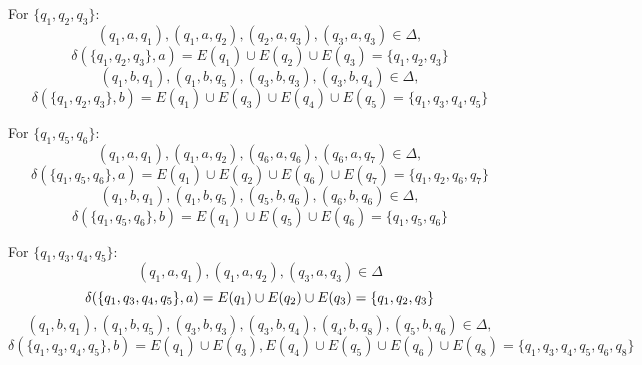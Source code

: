 \documentclass[12pt]{article}
\begin{document}
For $\{q_1, q_2, q_3\}$:
\begin{equation*}
	(q_1, a, q_1), (q_1, a, q_2), (q_2, a, q_3), (q_3, a, q_3) \in \Delta,
\end{equation*}
\begin{equation*}
	\delta (\{q_1, q_2, q_3\}, a) = E(q_1) \cup E(q_2) \cup E(q_3) = \{q_1, q_2, q_3\}
\end{equation*}
\begin{equation*}
	(q_1, b, q_1), (q_1, b, q_5), (q_3, b, q_3), (q_3, b, q_4) \in \Delta,
\end{equation*}
\begin{equation*}
	\delta (\{q_1, q_2, q_3\}, b) = E(q_1) \cup E(q_3) \cup E(q_4) \cup E(q_5) = \{q_1, q_3, q_4, q_5\}
\end{equation*}

For $\{q_1, q_5, q_6\}$:
\begin{equation*}
	(q_1, a, q_1), (q_1, a, q_2), (q_6, a, q_6), (q_6, a, q_7) \in \Delta,
\end{equation*}
\begin{equation*}
	\delta (\{q_1, q_5, q_6\}, a) = E(q_1) \cup E(q_2) \cup E(q_6) \cup E(q_7) = \{q_1, q_2, q_6, q_7\}
\end{equation*}
\begin{equation*}
	(q_1, b, q_1), (q_1, b, q_5), (q_5, b, q_6), (q_6, b, q_6) \in \Delta,
\end{equation*}
\begin{equation*}
	\delta (\{q_1, q_5, q_6\}, b) = E(q_1) \cup E(q_5) \cup E(q_6) = \{q_1, q_5, q_6\}
\end{equation*}

For $\{q_1, q_3, q_4, q_5\}$:
\begin{equation*}
	(q_1, a, q_1), (q_1, a, q_2), (q_3, a, q_3) \in \Delta 
\end{equation*}
\begin{equation*}
	\delta (\{q_1, q_3, q_4, q_5\}, a) = E(q_1) \cup E(q_2) \cup E(q_3) = \{q_1, q_2, q_3\}\\
\end{equation*}
\begin{equation*}
	(q_1, b, q_1), (q_1, b, q_5), (q_3, b, q_3), (q_3, b, q_4), (q_4,b,q_8), (q_5, b, q_6) \in \Delta, 
\end{equation*}
\begin{equation*}
	\delta (\{q_1, q_3, q_4, q_5\}, b) = E(q_1) \cup E(q_3), E(q_4) \cup E(q_5) \cup E(q_6) \cup E(q_8) = \{q_1, q_3, q_4, q_5, q_6, q_8\}
\end{equation*}
\end{document}
